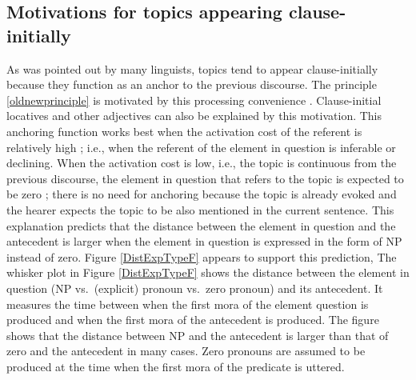 \subsection{Motivations for topics appearing clause-initially}\label{TopicAppearClause-Initially}

As was pointed out by many linguists,
topics tend to appear clause-initially
because they function as an anchor to the previous discourse.
The principle \ref{oldnewprinciple} is motivated by this processing convenience \cite[e.g.,][]{keenan77}.
Clause-initial locatives and other adjectives can also be explained by this motivation.
This anchoring function works best when the activation cost of the referent is relatively high \cite{givon83};
i.e.,
when the referent of the element in question is inferable or declining.
When the activation cost is low, i.e., the topic is continuous from the previous discourse,
the element in question that refers to the topic is expected to be zero \cite{givon83,gundeletal93,ariel90};
there is no need for anchoring because the topic is already evoked and the hearer expects the topic to be also mentioned in the current sentence.
This explanation predicts that the distance between the element in question and the antecedent is larger when the element in question is expressed in the form of NP instead of zero.
Figure \ref{DistExpTypeF} appears to support this prediction,
The whisker plot in Figure \ref{DistExpTypeF} shows the distance between the element in question (NP vs.\ (explicit) pronoun vs.\ zero pronoun) and its antecedent.
It measures the time between when the first mora of the element question is produced and when the first mora of the antecedent is produced.
The figure shows that the distance between NP and the antecedent is larger than that of zero and the antecedent in many cases.
Zero pronouns are assumed to be produced at the time
when the first mora of the predicate is uttered.

